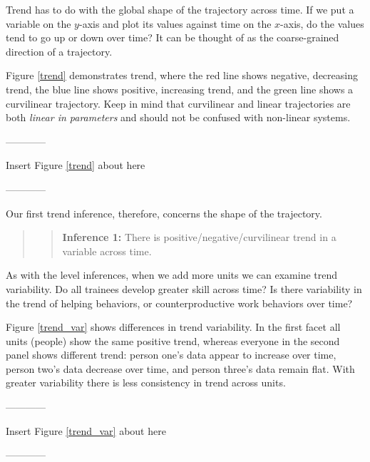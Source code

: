 \documentclass[english,,man]{apa6}
\theoremstyle{definition}
\theoremstyle{definition}
\theoremstyle{definition}
\theoremstyle{remark}
\begin{document}
Trend has to do with the global shape of the trajectory across time. If
we put a variable on the \(y\)-axis and plot its values against time on
the \(x\)-axis, do the values tend to go up or down over time? It can be
thought of as the coarse-grained direction of a trajectory.

Figure \ref{trend} demonstrates trend, where the red line shows
negative, decreasing trend, the blue line shows positive, increasing
trend, and the green line shows a curvilinear trajectory. Keep in mind
that curvilinear and linear trajectories are both \emph{linear in
parameters} and should not be confused with non-linear systems.

\begin{center}

------------

Insert Figure \ref{trend} about here

------------

\end{center}

Our first trend inference, therefore, concerns the shape of the
trajectory.

\begin{quote}
\begin{quote}
\textbf{Inference 1:} There is positive/negative/curvilinear trend in a
variable across time.
\end{quote}
\end{quote}

As with the level inferences, when we add more units we can examine
trend variability. Do all trainees develop greater skill across time? Is
there variability in the trend of helping behaviors, or
counterproductive work behaviors over time?

Figure \ref{trend_var} shows differences in trend variability. In the
first facet all units (people) show the same positive trend, whereas
everyone in the second panel shows different trend: person one's data
appear to increase over time, person two's data decrease over time, and
person three's data remain flat. With greater variability there is less
consistency in trend across units.

\begin{center}

------------

Insert Figure \ref{trend_var} about here

------------

\end{center}
\end{document}

